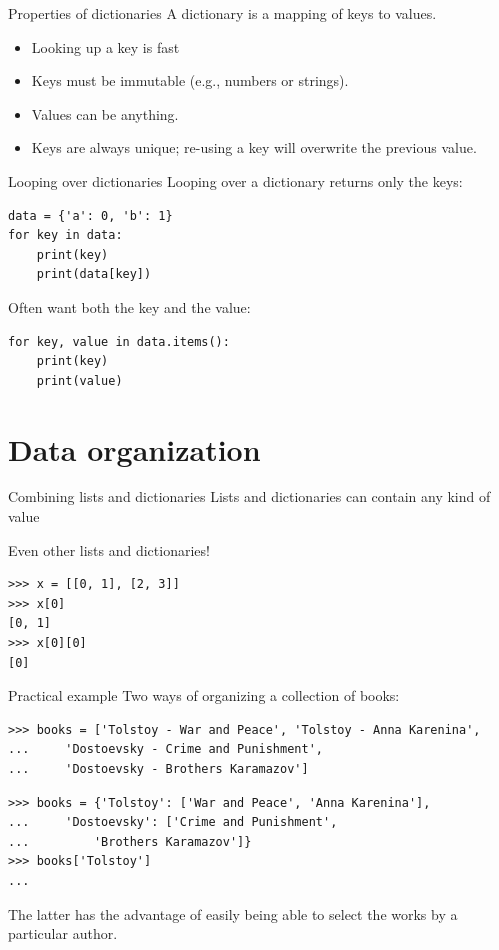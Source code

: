 \documentclass[aspectratio=169,usenames,dvipsnames]{beamer}
\begin{document}
\begin{frame}{Properties of dictionaries}
A dictionary is a mapping of keys to values.

    \begin{itemize}
        \item Looking up a key is fast
        \item Keys must be immutable (e.g., numbers or strings).
        \item Values can be anything.
        \item Keys are always unique;
            re-using a key will overwrite the previous value.
    \end{itemize}
\end{frame}

\begin{frame}[fragile]{Looping over dictionaries}
Looping over a dictionary returns only the keys:
\begin{lstlisting}
data = {'a': 0, 'b': 1}
for key in data:
    print(key)
    print(data[key])
\end{lstlisting}

\pause
Often want both the key and the value:
\begin{lstlisting}
for key, value in data.items():
    print(key)
    print(value)
\end{lstlisting}
\end{frame}


\section{Data organization}
\frame{\tableofcontents[currentsection]}

\begin{frame}[fragile]{Combining lists and dictionaries}
Lists and dictionaries can contain any kind of value

Even other lists and dictionaries!

\begin{lstlisting}
>>> x = [[0, 1], [2, 3]]
>>> x[0]
[0, 1]
>>> x[0][0]
[0]
\end{lstlisting}
\end{frame}

\begin{frame}[fragile]{Practical example}
Two ways of organizing a collection of books:
\begin{lstlisting}
>>> books = ['Tolstoy - War and Peace', 'Tolstoy - Anna Karenina',
...     'Dostoevsky - Crime and Punishment',
...     'Dostoevsky - Brothers Karamazov']
\end{lstlisting}

\pause
\begin{lstlisting}
>>> books = {'Tolstoy': ['War and Peace', 'Anna Karenina'],
...     'Dostoevsky': ['Crime and Punishment',
...         'Brothers Karamazov']}
>>> books['Tolstoy']
...
\end{lstlisting}
The latter has the advantage of easily being able to
select the works by a particular author.
\end{frame}
\end{document}
